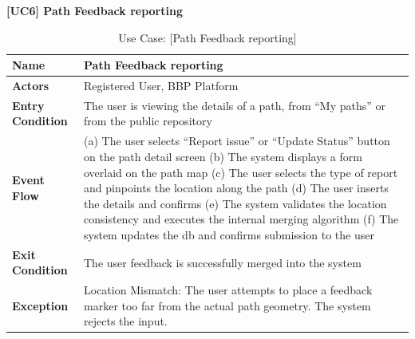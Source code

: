 \begin{table}[H]
    \centering
    \raggedright \textbf{\large [UC6] Path Feedback reporting} \\[0.2cm]

    \renewcommand{\arraystretch}{1.5}
    \begin{tabularx}{\textwidth}{|l|X|}
        \hline
        \textbf{Name} & \textbf{Path Feedback reporting} \\ \hline
        \textbf{Actors} & Registered User, BBP Platform \\ \hline
        \textbf{Entry Condition} & The user is viewing the details of a path, from ``My paths'' or from the public repository \\ \hline
        \textbf{Event Flow} & 
        (a) The user selects “Report issue” or “Update Status” button on the path detail screen \newline
        (b) The system displays a form overlaid on the path map \newline
        (c) The user selects the type of report and pinpoints the location along the path \newline
        (d) The user inserts the details and confirms \newline
        (e) The system validates the location consistency and executes the internal merging algorithm \newline
        (f) The system updates the db and confirms submission to the user
        \\ \hline
        \textbf{Exit Condition} & The user feedback is successfully merged into the system \\ \hline
        \textbf{Exception} & Location Mismatch: The user attempts to place a feedback marker too far from the actual path geometry. The system rejects the input. \\ \hline
    \end{tabularx}
    \caption{Use Case: [Path Feedback reporting]}
    \label{tab:uc6_feedback_reporting}
\end{table}

